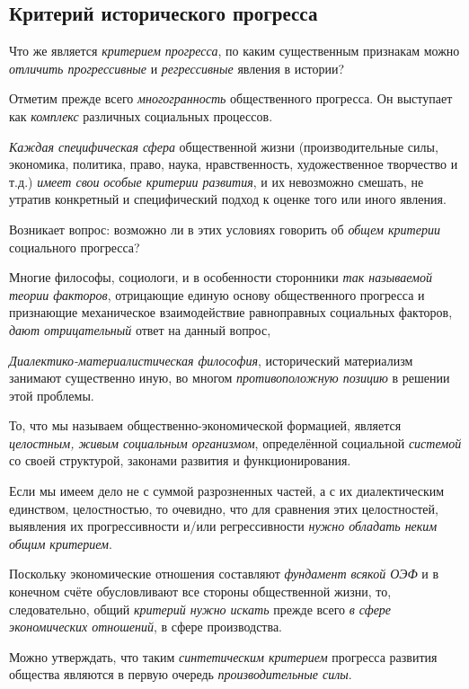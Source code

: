 \documentclass[a4paper,14pt,russian]{extreport}
\begin{document}
\subsection{Критерий исторического прогресса}

Что же является \emph{критерием прогресса}, по каким существенным признакам можно \emph{отличить прогрессивные} и \emph{регрессивные} явления в истории?

Отметим прежде всего \emph{многогранность} общественного прогресса. Он выступает как \emph{комплекс} различных социальных процессов.

\emph{Каждая специфическая сфера} общественной жизни (производительные силы, экономика, политика, право, наука, нравственность, художественное творчество и т.д.) \emph{имеет свои} \emph{особые критерии развития}, и их невозможно смешать, не утратив конкретный и специфический подход к оценке того или иного явления.

Возникает вопрос: возможно ли в этих условиях говорить об \emph{общем критерии} социального прогресса?

Многие философы, социологи, и в особенности сторонники \emph{так называемой теории факторов}, отрицающие единую основу общественного прогресса и признающие механическое взаимодействие равноправных социальных факторов, \emph{дают отрицательный} ответ на данный вопрос,

\emph{Диалектико-материалистическая философия}, исторический материализм занимают существенно иную, во многом \emph{противоположную позицию} в решении этой проблемы.

То, что мы называем общественно-экономической формацией, является \emph{целостным, живым социальным организмом}, определённой социальной \emph{системой} со своей структурой, законами развития и функционирования.

Если мы имеем дело не с суммой разрозненных частей, а с их диалектическим единством, целостностью, то очевидно, что для сравнения этих целостностей, выявления их прогрессивности и/или регрессивности \emph{нужно обладать неким общим критерием}.

Поскольку экономические отношения составляют \emph{фундамент всякой ОЭФ} и в конечном счёте обусловливают все стороны общественной жизни, то, следовательно, общий \emph{критерий нужно искать} прежде всего \emph{в сфере экономических отношений}, в сфере производства.

Можно утверждать, что таким \emph{синтетическим критерием} прогресса развития общества являются в первую очередь \emph{производительные силы}.
\end{document}

